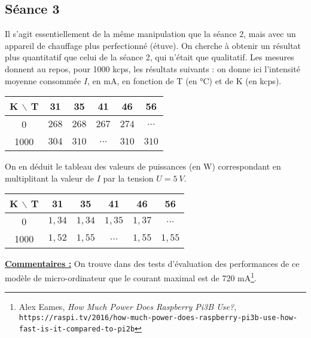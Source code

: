 \documentclass[french]{article}
\newcommand{\bs}{\xspace$\backslash$\xspace}
\begin{document}
\subsection{Séance 3}

Il s'agit essentiellement de la même manipulation que la séance 2, mais avec un appareil de chauffage plus perfectionné (étuve). On cherche à obtenir un résultat plus quantitatif que celui de la séance 2, qui n'était que qualitatif. Les mesures donnent au repos, pour 1000 kcps, les résultats suivants : on donne ici l'intensité moyenne consommée $I$, en mA, en fonction de T (en °C) et de K (en kcps).

\begin{table}[ht]
    \centering
    \begin{tabular}{|c|c|c|c|c|c|} \hline
    \textbf{K \bs T } &   31  &   35  &   41  &   46  &   56  \\ \hline
            0         &$ 268 $&$ 268 $&$ 267 $&$ 274 $&$ ... $\\ \hline
            1000      &$ 304 $&$ 310 $&$ ... $&$ 310 $&$ 310 $\\ \hline
    \end{tabular}
\end{table}

On en déduit le tableau des valeurs de puissances (en W) correspondant en multiplitant la valeur de $I$ par la tension $U = \SI{5}{V}$.

\begin{table}[ht]
    \centering
    \begin{tabular}{|c|c|c|c|c|c|} \hline
    \textbf{K \bs T } &   31  &   35  &   41  &   46  &   56  \\ \hline
            0         &$ 1,34 $&$ 1,34 $&$ 1,35 $&$ 1,37 $&$ ... $\\ \hline
            1000      &$ 1,52 $&$ 1,55 $&$ ... $&$ 1,55 $&$ 1,55 $\\ \hline
    \end{tabular}
\end{table}

\underline{\textbf{Commentaires :}} On trouve dans des tests d'évaluation des performances de ce modèle de micro-ordinateur que le courant maximal est de 720 mA\footnote{Alex Eames, \textit{How Much Power Does Raspberry Pi3B Use?}, \texttt{https://raspi.tv/2016/how-much-power-does-raspberry-pi3b-use-how-fast-is-it-compared-to-pi2b}}.
\end{document}

